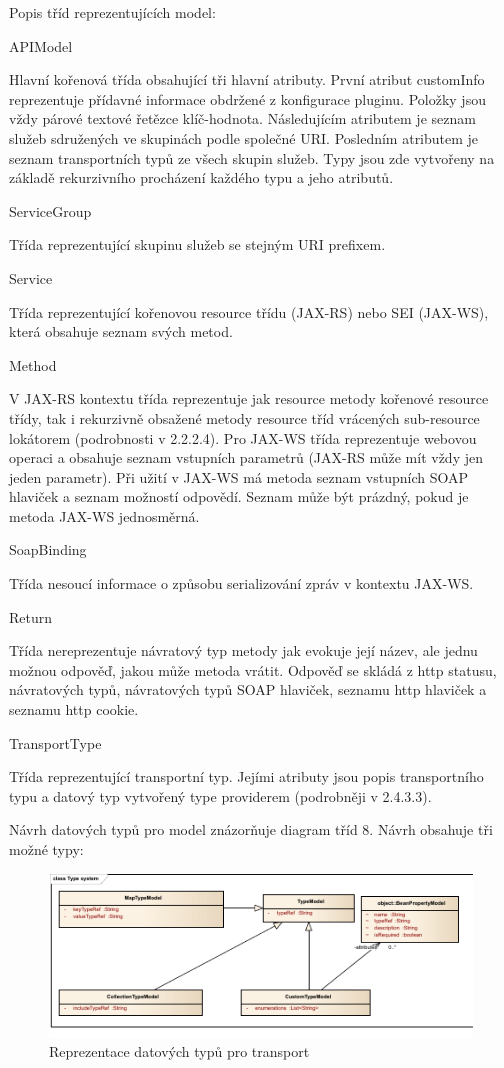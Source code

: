 \documentclass[11pt,twoside,a4paper]{book}
\begin{document}
Popis tříd reprezentujících model:

APIModel

Hlavní kořenová třída obsahující tři hlavní atributy. První atribut customInfo reprezentuje
přídavné informace obdržené z konfigurace pluginu. Položky jsou vždy párové textové
řetězce klíč-hodnota. Následujícím atributem je seznam služeb sdružených ve skupinách
podle společné URI. Posledním atributem je seznam transportních typů ze všech skupin
služeb. Typy jsou zde vytvořeny na základě rekurzivního procházení každého typu a jeho
atributů.

ServiceGroup

Třída reprezentující skupinu služeb se stejným URI prefixem.

Service

Třída reprezentující kořenovou resource třídu (JAX-RS) nebo SEI (JAX-WS), která obsahuje
seznam svých metod.

Method

V JAX-RS kontextu třída reprezentuje jak resource metody kořenové resource třídy, tak i
rekurzivně obsažené metody resource tříd vrácených sub-resource lokátorem (podrobnosti v
2.2.2.4). Pro JAX-WS třída reprezentuje webovou operaci a obsahuje seznam vstupních
parametrů (JAX-RS může mít vždy jen jeden parametr). Při užití v JAX-WS má metoda
seznam vstupních SOAP hlaviček a seznam možností odpovědí. Seznam může být prázdný,
pokud je metoda JAX-WS jednosměrná.

SoapBinding

Třída nesoucí informace o způsobu serializování zpráv v kontextu JAX-WS.

Return

Třída nereprezentuje návratový typ metody jak evokuje její název, ale jednu možnou
odpověď, jakou může metoda vrátit. Odpověď se skládá z http statusu, návratových typů,
návratových typů SOAP hlaviček, seznamu http hlaviček a seznamu http cookie.

TransportType

Třída reprezentující transportní typ. Jejími atributy jsou popis transportního typu a datový typ
vytvořený type providerem (podrobněji v 2.4.3.3).

Návrh datových typů pro model znázorňuje diagram tříd 8. Návrh obsahuje tři možné typy:

\begin{figure}[h]
\begin{center}
\includegraphics[width=13cm]{images-pdf/Type-System.pdf}
\caption{Reprezentace datových typů pro transport}
\label{fig:logo}
\end{center}
\end{figure}
\end{document}

